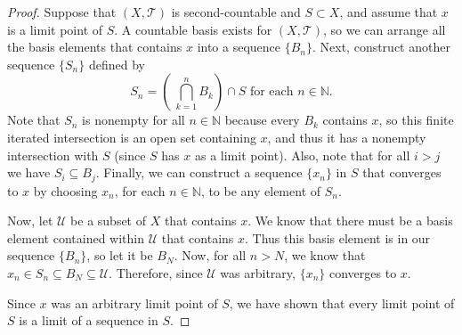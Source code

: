 \documentclass[12pt]{article}
\newcommand{\N}{\mathbb{N}}
\newcommand{\T}{\mathcal{T}}
\newcommand{\U}{\mathcal{U}}
\begin{document}
\begin{proof}

Suppose that $(X, \T)$ is second-countable and $S \subset X$, and assume that $x$ is a limit point of $S$.  A countable basis exists for $(X, \T)$, so we can arrange all the basis elements that contains $x$ into a sequence $\{ B_n \}$.  Next, construct another sequence $\{ S_n \}$ defined by $$S_n = \left( \  \bigcap_{k=1}^n B_k  \right) \cap S \textrm{ for each } n \in \N.$$  Note that $S_n$ is nonempty for all $n \in \N$ because every $B_k$ contains $x$, so this finite iterated intersection is an open set containing $x$, and thus it has a nonempty intersection with $S$ (since $S$ has $x$ as a limit point).  Also, note that for all $i > j$ we have $S_i \subseteq B_j$.  Finally, we can construct a sequence $\{ x_n \}$ in $S$ that converges to $x$ by choosing $x_n$, for each $n \in \N$, to be any element of $S_n$.  

Now, let $\U$ be a subset of $X$ that contains $x$.  We know that there must be a basis element contained within $\U$ that contains $x$.  Thus this basis element is in our sequence $ \{ B_n \}$, so let it be $B_N$.  Now, for all $n > N$, we know that $x_n \in S_n \subseteq B_N \subseteq \U$.  Therefore, since $\U$ was arbitrary, $\{ x_n \}$ converges to $x$.

Since $x$ was an arbitrary limit point of $S$, we have shown that every limit point of $S$ is a limit of a sequence in $S$.


\end{proof}
\end{document}
